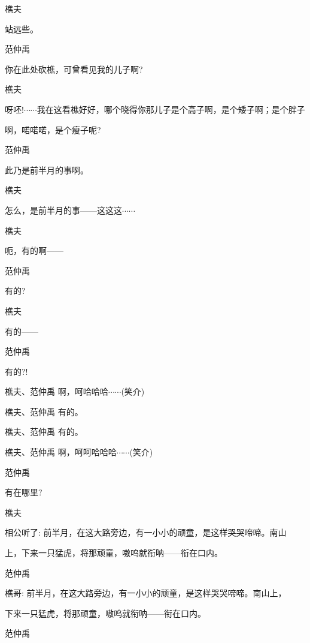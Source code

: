 {樵夫\hspace{30pt}~

站远些。}

范仲禹\hspace{20pt}~

你在此处砍樵，可曾看见我的儿子啊?

{樵夫

呀呸!$\cdots{}\cdots{}$我在这看樵好好，哪个晓得你那儿子是个高子啊，是个矮子啊；是个胖子

啊，喏喏喏，是个瘦子呢?}

范仲禹\hspace{20pt}~

此乃是前半月的事啊。

樵夫\hspace{30pt}~

怎么，是前半月的事------这这这{$\cdots{}\cdots{}$}

{樵夫\hspace{30pt}~

呃，有的啊------}

范仲禹\hspace{20pt}~

有的?

樵夫\hspace{30pt}~

有的------

范仲禹\hspace{20pt}~

有的?!

樵夫、范仲禹 啊，呵哈哈哈$\cdots{}\cdots{}$(笑介)

樵夫、范仲禹 有的。

樵夫、范仲禹 有的。

樵夫、范仲禹 啊，呵呵哈哈哈$\cdots{}\cdots{}$(笑介)

范仲禹\hspace{20pt}~

有在哪里?

樵夫

相公听了: 前半月，在这大路旁边，有一小小的顽童，是这样哭哭啼啼。南山

上，下来一只猛虎，将那顽童，嗷呜就衔呐------衔在口内。

范仲禹

樵哥: 前半月，在这大路旁边，有一小小的顽童，是这样哭哭啼啼。南山上，

下来一只猛虎，将那顽童，嗷呜就衔呐------衔在口内。

范仲禹\hspace{20pt}~

